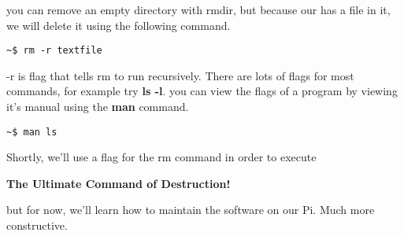 		you can remove an empty directory with rmdir, but because our has a file in it, we will delete it using the following command.
\begin{lstlisting}
~$ rm -r textfile
\end{lstlisting}

		-r is flag that tells rm to run recursively. There are lots of flags for most commands, for example try \textbf{ls -l}. you can view the flags of a program by viewing it's manual using the \textbf{man} command.
\begin{lstlisting}
~$ man ls
\end{lstlisting}

		Shortly, we'll use a flag for the rm command in order to execute
		
		\large \textbf{The Ultimate Command of Destruction!} \normalsize
		
		but for now, we'll learn how to maintain the software on our Pi. Much more constructive.
		
		